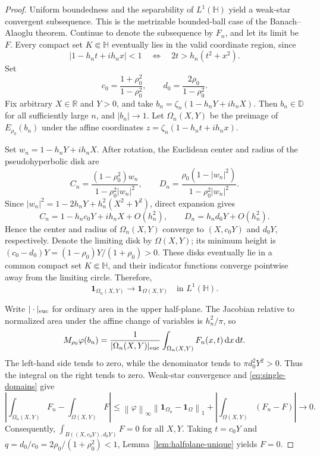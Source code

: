 \documentclass[12pt,a4paper]{article}
\theoremstyle{remark}
\newcommand{\D}{\mathbb D}
\newcommand{\dd}{\,\mathrm d}
\newcommand{\norm}[1]{\left\lVert#1\right\rVert}
\begin{document}
\begin{proof}
Uniform boundedness and the separability of $L^1(\mathbb H)$ yield a weak-star convergent subsequence.
This is the metrizable bounded-ball case of the Banach--Alaoglu theorem.
Continue to denote the subsequence by $F_n$, and let its limit be $F$.
Every compact set $K\Subset\mathbb H$ eventually lies in the valid coordinate region, since
\[
|1-h_nt+ih_nx|<1\quad\Longleftrightarrow\quad
2t>h_n(t^2+x^2).
\]
Set
\[
c_0=\frac{1+\rho_0^2}{1-\rho_0^2},\qquad
 d_0=\frac{2\rho_0}{1-\rho_0^2}.
\]
Fix arbitrary $X\in\mathbb R$ and $Y>0$, and take
$b_n=\zeta_n(1-h_nY+ih_nX)$.
Then $b_n\in\D$ for all sufficiently large $n$, and $|b_n|\to1$.
Let $\Omega_n(X,Y)$ be the preimage of $E_{\rho_0}(b_n)$ under the affine coordinates
$z=\zeta_n(1-h_nt+ih_nx)$.

Set $w_n=1-h_nY+ih_nX$. After rotation, the Euclidean center and radius of the pseudohyperbolic disk are
\[
C_n=\frac{(1-\rho_0^2)w_n}{1-\rho_0^2|w_n|^2},\qquad
D_n=\frac{\rho_0(1-|w_n|^2)}{1-\rho_0^2|w_n|^2}.
\]
Since $|w_n|^2=1-2h_nY+h_n^2(X^2+Y^2)$, direct expansion gives
\[
C_n=1-h_nc_0Y+ih_nX+O(h_n^2),\qquad
D_n=h_nd_0Y+O(h_n^2).
\]
Hence the center and radius of $\Omega_n(X,Y)$ converge to $(X,c_0Y)$ and $d_0Y$, respectively.
Denote the limiting disk by $\Omega(X,Y)$; its minimum height is
$(c_0-d_0)Y=(1-\rho_0)Y/(1+\rho_0)>0$.
These disks eventually lie in a common compact set $K\Subset\mathbb H$, and their indicator functions converge pointwise away from the limiting circle.
Therefore,
\begin{equation}\label{eq:single-domains}
\mathbf1_{\Omega_n(X,Y)}\longrightarrow\mathbf1_{\Omega(X,Y)}
\quad\text{in }L^1(\mathbb H).
\end{equation}

Write $|\cdot|_{\rm euc}$ for ordinary area in the upper half-plane.
The Jacobian relative to normalized area under the affine change of variables is $h_n^2/\pi$, so
\[
M_{\rho_0}\varphi(b_n)
=\frac1{|\Omega_n(X,Y)|_{\rm euc}}
\int_{\Omega_n(X,Y)}F_n(x,t)\dd x\dd t.
\]
The left-hand side tends to zero, while the denominator tends to $\pi d_0^2Y^2>0$. Thus the integral on the right tends to zero.
Weak-star convergence and \eqref{eq:single-domains} give
\[
\left|\int_{\Omega_n(X,Y)}F_n-\int_{\Omega(X,Y)}F\right|
\le \norm\varphi_\infty\norm{\mathbf1_{\Omega_n}-\mathbf1_{\Omega}}_1
 +\left|\int_{\Omega(X,Y)}(F_n-F)\right|\longrightarrow0.
\]
Consequently, $\int_{B((X,c_0Y),d_0Y)}F=0$ for all $X,Y$.
Taking $t=c_0Y$ and $q=d_0/c_0=2\rho_0/(1+\rho_0^2)<1$,
Lemma~\ref{lem:halfplane-unique} yields $F=0$.
\end{proof}
\end{document}
